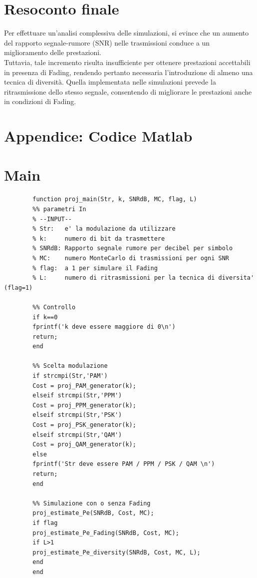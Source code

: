 \documentclass[12pt, a4paper]{article}
\begin{document}
	
	
	
	\newpage
	\section{Resoconto finale}
	Per effettuare un'analisi complessiva delle simulazioni, si evince che un aumento del rapporto segnale-rumore (SNR) nelle trasmissioni conduce a un miglioramento delle prestazioni. 
	\\Tuttavia, tale incremento risulta insufficiente per ottenere prestazioni accettabili in presenza di Fading, rendendo pertanto necessaria l'introduzione di almeno una tecnica di diversità. Quella implementata nelle simulazioni prevede la ritrasmissione dello stesso segnale, consentendo di migliorare le prestazioni anche in condizioni di Fading.
	
	\vspace{2cm}
	\appendix
	\section*{Appendice: Codice Matlab}
	
	\section{Main}
	\begin{lstlisting}
		function proj_main(Str, k, SNRdB, MC, flag, L)
		%% parametri In
		% --INPUT--
		% Str:   e' la modulazione da utilizzare 
		% k:     numero di bit da trasmettere
		% SNRdB: Rapporto segnale rumore per decibel per simbolo
		% MC:    numero MonteCarlo di trasmissioni per ogni SNR
		% flag:  a 1 per simulare il Fading
		% L:     numero di ritrasmissioni per la tecnica di diversita' (flag=1)
		
		%% Controllo
		if k==0
		fprintf('k deve essere maggiore di 0\n')
		return;
		end
		
		%% Scelta modulazione
		if strcmpi(Str,'PAM')
		Cost = proj_PAM_generator(k);    
		elseif strcmpi(Str,'PPM')
		Cost = proj_PPM_generator(k);
		elseif strcmpi(Str,'PSK')
		Cost = proj_PSK_generator(k);
		elseif strcmpi(Str,'QAM')
		Cost = proj_QAM_generator(k);
		else
		fprintf('Str deve essere PAM / PPM / PSK / QAM \n')
		return;
		end
		
		%% Simulazione con o senza Fading
		proj_estimate_Pe(SNRdB, Cost, MC);
		if flag
		proj_estimate_Pe_Fading(SNRdB, Cost, MC);
		if L>1
		proj_estimate_Pe_diversity(SNRdB, Cost, MC, L);
		end
		end
	\end{lstlisting}
	
\end{document}
